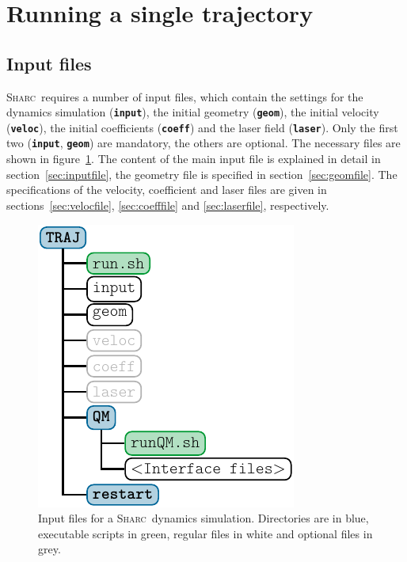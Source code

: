 \documentclass[a4paper,10pt,DIV=15,openany]{scrbook}
\newcommand{\sharc}{\textsc{Sharc}}
\newcommand{\ttt}[1]{\textbf{\texttt{#1}}}
\begin{document}
\section{Running a single trajectory}

\subsection{Input files}

\sharc\ requires a number of input files, which contain the settings for the dynamics simulation (\ttt{input}), the initial geometry (\ttt{geom}), the initial velocity (\ttt{veloc}), the initial coefficients (\ttt{coeff}) and the laser field (\ttt{laser}). Only the first two (\ttt{input}, \ttt{geom}) are mandatory, the others are optional. The necessary files are shown in figure~\ref{fig:dir_traj}. 
The content of the main input file is explained in detail in section~\ref{sec:inputfile}, the geometry file is specified in section~\ref{sec:geomfile}. The specifications of the velocity, coefficient and laser files are given in sections~\ref{sec:velocfile}, \ref{sec:coefffile} and \ref{sec:laserfile}, respectively.

\begin{figure}[htb]
  \centering
  \includegraphics[scale=1]{img/dir_traj/dir_traj.pdf}
  \caption[Input files for a \sharc\ dynamics simulation.]{Input files for a \sharc\ dynamics simulation. Directories are in blue, executable scripts in green, regular files in white and optional files in grey.}
  \label{fig:dir_traj}
\end{figure}
\end{document}
